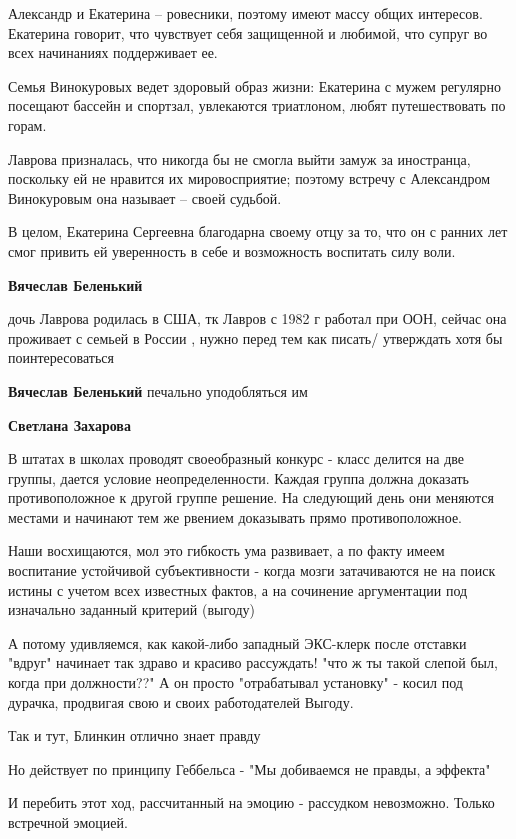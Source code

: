 \begin{itemize}
\begin{itemize}
\begin{multicols}{2}
Александр и Екатерина – ровесники, поэтому имеют массу общих интересов.
Екатерина говорит, что чувствует себя защищенной и любимой, что супруг во всех
начинаниях поддерживает ее.

Семья Винокуровых ведет здоровый образ жизни: Екатерина с мужем регулярно
посещают бассейн и спортзал, увлекаются триатлоном, любят путешествовать по
горам.

Лаврова призналась, что никогда бы не смогла выйти замуж за иностранца,
поскольку ей не нравится их мировосприятие; поэтому встречу с Александром
Винокуровым она называет – своей судьбой.

В целом, Екатерина Сергеевна благодарна своему отцу за то, что он с ранних лет
смог привить ей уверенность в себе и возможность воспитать силу воли.

\end{multicols}

\textbf{Вячеслав Беленький} 

дочь Лаврова родилась в США, тк Лавров с 1982 г работал при ООН, сейчас она
проживает с семьей в России , нужно перед тем как писать/ утверждать хотя бы
поинтересоваться

\textbf{Вячеслав Беленький} печально уподобляться им

\textbf{Светлана Захарова}

В штатах в школах проводят своеобразный конкурс - класс делится на две группы,
дается условие неопределенности. Каждая группа должна доказать противоположное
к другой группе решение. На следующий день они меняются местами и начинают тем
же рвением доказывать прямо противоположное.

Наши восхищаются, мол это гибкость ума развивает, а по факту имеем воспитание
устойчивой субъективности - когда мозги затачиваются не на поиск истины с
учетом всех известных фактов, а на сочинение аргументации под изначально
заданный критерий (выгоду)

А потому удивляемся, как какой-либо западный ЭКС-клерк после отставки "вдруг"
начинает так здраво и красиво рассуждать! "что ж ты такой слепой был, когда при
должности??" А он просто "отрабатывал установку" - косил под дурачка, продвигая
свою и своих работодателей Выгоду.

Так и тут, Блинкин отлично знает правду

Но действует по принципу Геббельса - "Мы добиваемся не правды, а эффекта"

И перебить этот ход, рассчитанный на эмоцию - рассудком невозможно. Только
встречной эмоцией.


\end{itemize}
\end{itemize}
